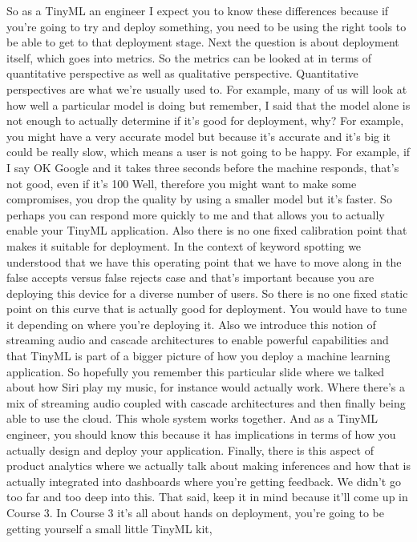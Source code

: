 So as a TinyML an engineer I expect you to know these differences
because if you're going to try and deploy something,
you need to be using the right tools to be
able to get to that deployment stage.
Next the question is about deployment itself, which goes into metrics.
So the metrics can be looked at in terms of quantitative perspective
as well as qualitative perspective.
Quantitative perspectives are what we're usually used to.
For example, many of us will look at how well a particular model is
doing but remember, I said that the model alone
is not enough to actually determine if it's good for deployment, why?
For example, you might have a very accurate model
but because it's accurate and it's big it could be really slow,
which means a user is not going to be happy.
For example, if I say OK Google and it takes three seconds
before the machine responds, that's not good, even if it's 100%
Well, therefore you might want to make some compromises,
you drop the quality by using a smaller model but it's faster.
So perhaps you can respond more quickly to me
and that allows you to actually enable your TinyML application.
Also there is no one fixed calibration point
that makes it suitable for deployment.
In the context of keyword spotting we understood
that we have this operating point that we
have to move along in the false accepts versus false rejects case
and that's important because you are deploying
this device for a diverse number of users.
So there is no one fixed static point on this curve
that is actually good for deployment.
You would have to tune it depending on where you're deploying it.
Also we introduce this notion of streaming audio and cascade
architectures to enable powerful capabilities
and that TinyML is part of a bigger picture of how you
deploy a machine learning application.
So hopefully you remember this particular slide
where we talked about how Siri play my music,
for instance would actually work.
Where there's a mix of streaming audio coupled
with cascade architectures and then finally being able to use the cloud.
This whole system works together.
And as a TinyML engineer, you should know this
because it has implications in terms of how you actually design and deploy
your application.
Finally, there is this aspect of product analytics
where we actually talk about making inferences
and how that is actually integrated into dashboards where
you're getting feedback.
We didn't go too far and too deep into this.
That said, keep it in mind because it'll come up in Course 3.
In Course 3 it's all about hands on deployment,
you're going to be getting yourself a small little TinyML kit,
